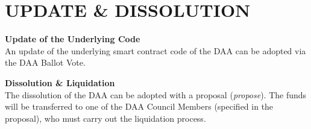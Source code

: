\section{UPDATE \& DISSOLUTION}\label{sec:update-&-dissolution}

\item \textbf{Update of the Underlying Code} \\
An update of the underlying smart contract code of the DAA can be adopted via the DAA Ballot Vote.

\item \textbf{Dissolution \& Liquidation} \\
The dissolution of the DAA can be adopted with a proposal (\emph{propose}).
The funds will be transferred to one of the DAA Council Members (specified in the proposal), who must carry out the liquidation process.
